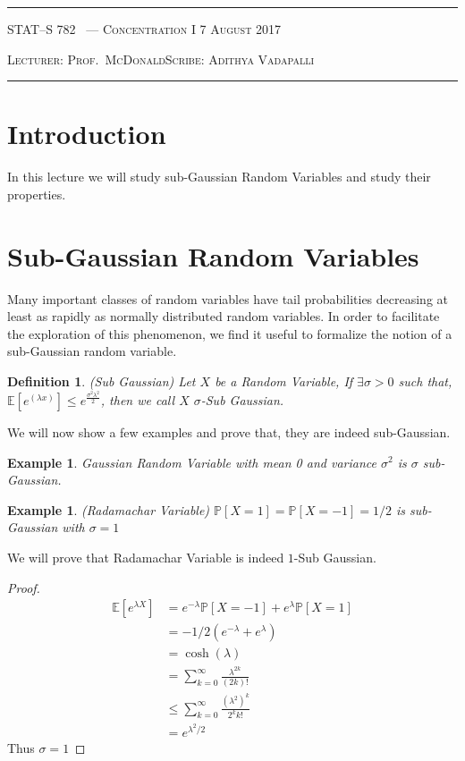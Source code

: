 \documentclass[10pt]{article}
\newcounter{lecnum}
\newtheorem{definition}[def]{Definition}
\newtheorem{example}[ex]{Example}
\renewcommand{\P}{\mathbb{P}}
\newcommand{\lecturer}{Prof.\ McDonald}
\newcommand{\scribe}{Adithya Vadapalli}
\newcommand{\chtitle}{Concentration I}
\newcommand{\lecdate}{7 August 2017}
\begin{document}
	\rule{6.5in}{1pt}
	
	\textsc{STAT--S 782
		\hfill \thelecnum\ --- \chtitle
		\hfill \lecdate}
	
	\textsc{Lecturer: \lecturer \hfill Scribe: \scribe}
	\rule{6.5in}{1pt}
	
	
	\section*{Introduction}
	In this lecture we will study sub-Gaussian Random Variables and study their properties.
	
	\section{Sub-Gaussian Random Variables}
	Many important classes of random variables have tail probabilities decreasing at
	least as rapidly as normally distributed random variables. In order to facilitate
	the exploration of this phenomenon, we find it useful to formalize the notion of a
	sub-Gaussian random variable.
	\begin{definition} (Sub Gaussian)
		Let $X$ be a Random Variable, If $\exists \sigma > 0$ such that, $\mathbb{E}[e^{(\lambda x)}] \le e^{\frac{\sigma^2 \lambda^2}{2}}$, then we call $X$ $\sigma$-Sub Gaussian.
	\end{definition}
	We will now show a few examples and prove that, they are indeed sub-Gaussian.
	\begin{example}
		Gaussian Random Variable with mean 0 and variance $\sigma^{2}$ is $\sigma$ sub-Gaussian.
	\end{example}

    \begin{example}(Radamachar Variable)
    	$\P[X = 1] = \P[X = -1] = 1/2$ is sub-Gaussian with $\sigma = 1$
    \end{example}
	
	We will prove that Radamachar Variable is indeed $1$-Sub Gaussian. 
	\begin{proof}
		\begin{align*} 
		\mathbb{E}[e^{\lambda X}] &= e^{-\lambda} \P[X = -1] + e^{\lambda} \P[X = 1] \\ 
		 &=  -1/2(e^{-\lambda} + e^{\lambda}) \\
		 &= \cosh(\lambda) \\
		 &= \sum_{k=0}^{\infty} \frac{\lambda^{2k}}{(2k)!} \\
		 &\le \sum_{k=0}^{\infty} \frac{(\lambda^{2})^{k}}{2^{k} k!} \\
		 &= e^{\lambda^{2}/2}
		\end{align*}
		Thus $\sigma = 1$
	\end{proof} 
	
\end{document}
